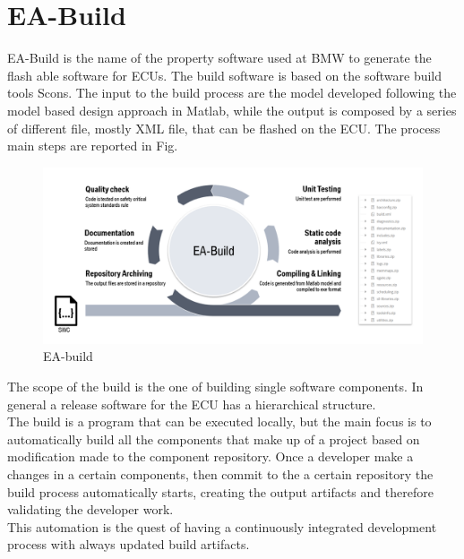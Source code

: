 \documentclass[../main.tex]{subfiles}
\begin{document}
\section{EA-Build}
EA-Build is the name of the property software used at BMW to generate the flash able software for ECUs. The build software is based on the software build tools Scons. The input to the build process are the model developed following the model based design approach in Matlab, while the output is composed by a series of different file, mostly XML file, that can be flashed on the \gls{ECU}. The process main steps are reported in Fig.
\begin{figure}[h]
    \centering
    \includegraphics[width=\linewidth]{images_folder/build_proc.png}
    \caption{EA-build}
    \label{fig:eabuild}
\end{figure}
The scope of the build is the one of building single software components. In general a release software for the \gls{ECU} has a hierarchical structure.\\
The build is a program that can be executed locally, but the main focus is to automatically build all the components that make up of a project based on modification made to the component repository. Once a developer make a changes in a certain components, then commit to the a certain repository the build process automatically starts, creating the output artifacts and therefore validating the developer work. \\
This automation is the quest of having a continuously integrated development process with always updated build artifacts. 
\cleardoublepage
\end{document}
